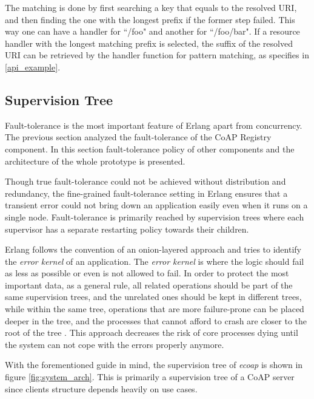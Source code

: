 The matching is done by first searching a key that equals to the resolved URI, and then finding the one with the longest prefix if the former step failed. This way one can have a handler for ``/foo" and another for ``/foo/bar". If a resource handler with the longest matching prefix is selected, the suffix of the resolved URI can be retrieved by the handler function for pattern matching, as specifies in \ref{api_example}.

\begin{figure}
\label{fig:coap_registry}
\end{figure}

\subsection{Supervision Tree}

Fault-tolerance is the most important feature of Erlang apart from concurrency. The previous section analyzed the fault-tolerance of the CoAP Registry component. In this section fault-tolerance policy of other components and the architecture of the whole prototype is presented.

Though true fault-tolerance could not be achieved without distribution and redundancy, the fine-grained fault-tolerance setting in Erlang ensures that a transient error could not bring down an application easily even when it runs on a single node. Fault-tolerance is primarily reached by supervision trees where each supervisor has a separate restarting policy towards their children. 

Erlang follows the convention of an onion-layered approach and tries to identify the \textit{error kernel} of an application. The \textit{error kernel} is where the logic should fail as less as possible or even is not allowed to fail. In order to protect the most important data, as a general rule, all related operations should be part of the same supervision trees, and the unrelated ones should be kept in different trees, while within the same tree, operations that are more failure-prone can be placed deeper in the tree, and the processes that cannot afford to crash are closer to the root of the tree \cite{learn_you_some_erlang}. This approach decreases the risk of core processes dying until the system can not cope with the errors properly anymore.

With the forementioned guide in mind, the supervision tree of \textit{ecoap} is shown in figure \ref{fig:system_arch}. This is primarily a supervision tree of a CoAP server since clients structure depends heavily on use cases. 

